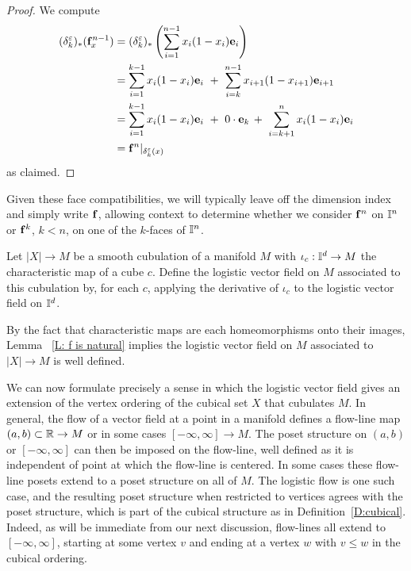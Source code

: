 \begin{proof}
	We compute
	\begin{align*}
		(\delta_{k}^\varepsilon)_*(\mathbf{f}^{n-1}_x) & = (\delta_{k}^\varepsilon)_* \left(\sum_{i=1}^{n-1 } x_{i} (1 - x_{i}) \mathbf{e}_{i} \right) \\ & =
		\sum_{i=1 }^{k-1} x_{i} (1 - x_{i}) \mathbf{e}_{i}\ +\
		\sum_{i=k}^{n-1} x_{i+1} (1 - x_{i+1}) \mathbf{e}_{i+1} \\ & =
		\sum_{i=1}^{k-1} x_{i} (1 - x_{i}) \mathbf{e}_{i}\ +\
		0 \cdot \mathbf{e}_k\, + \
		\sum_{i=k+1}^n x_{i} (1 - x_{i}) \mathbf{e}_{i} \\ & =
		\mathbf{f}^n|_{\delta_k^\varepsilon(x)}
	\end{align*}
	as claimed.
\end{proof}

Given these face compatibilities, we will typically leave off the dimension index and simply write $\mathbf{f}$, allowing context to determine whether we consider $\mathbf{f}^n$ on $\mathbb{I}^n$ or $\mathbf{f}^k$, $k<n$, on one of the $k$-faces of $\mathbb{I}^n$.

\begin{definition}
	Let $ |X| \to M$ be a smooth cubulation of a manifold $M$ with $\iota_c : \mathbb{I}^d \to M$ the characteristic map of a cube $c$.
	Define the logistic vector field on $M$ associated to this cubulation by, for each $c$, applying the derivative
	of $\iota_c$ to the logistic vector field on $\mathbb{I}^d$.
\end{definition}

By the fact that characteristic maps are each homeomorphisms onto their images, Lemma ~\ref{L: f is natural} implies the logistic vector field on $M$ associated to $|X| \to M$ is well defined.

We can now formulate precisely a sense in which the logistic vector field gives an extension of the vertex ordering of the cubical set $X$ that cubulates $M$.
In general, the flow of a vector field at a point in a manifold defines a flow-line map $(a,b) \subset \mathbb{R} \to M$ or in some cases $[-\infty, \infty] \to M$.
The poset structure on $(a,b)$ or
$[-\infty, \infty]$ can then be imposed on the flow-line, well defined as it is independent of point at which the flow-line is centered.
In some cases these flow-line posets extend to a poset structure on all of $M$.
The logistic flow is one such case, and the resulting poset structure when restricted to vertices agrees with the poset structure,
which is part of the cubical structure as in
Definition~\ref{D:cubical}. Indeed, as will be immediate from our next discussion,
flow-lines all extend to $[-\infty, \infty]$, starting at some vertex $v$ and ending at a vertex $w$ with $v \leq w$ in the cubical ordering.

